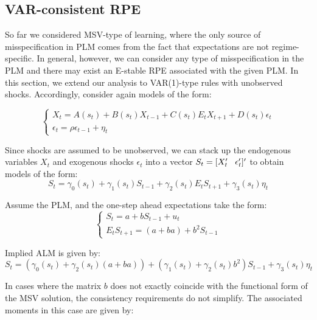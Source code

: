 \documentclass[12pt,reqno]{article}
\numberwithin{equation}{section}
\begin{document}





\subsection{VAR-consistent RPE} 

So far we considered MSV-type of learning, where the only source of misspecification in PLM comes from the fact that expectations are not regime-specific. In general, however, we can consider any type of misspecification in the PLM and there may exist an E-stable RPE associated with the given PLM. In this section, we extend our analysis to VAR(1)-type rules with unobserved shocks. 
Accordingly, consider again models of the form:

$$
\begin{cases}
X_t = A(s_t) + B(s_t) X_{t-1} + C(s_t) E_t X_{t+1} + D(s_t) \epsilon_t \\
\epsilon_t = \rho \epsilon_{t-1} + \eta_t 
\end{cases}
$$

Since shocks are assumed to be unobserved, we can stack up the endogenous variables $X_t $ and exogenous shocks $\epsilon_t $ into a vector $ S_t = [X_t' \hspace{3 mm}\epsilon_t']' $ to obtain models of the form: \\

$$
S_t = \gamma_0 (s_t) + \gamma_1 (s_t) S_{t-1} + \gamma_2(s_t) E_t S_{t+1}  + \gamma_3 (s_t) \eta_t
$$

Assume the PLM, and the one-step ahead expectations take the form: \\

$$
\begin{cases}
S_t = a + b S_{t-1} + u_t \\
E_t S_{t+1} = (a+ba)+ b^2 S_{t-1} 
\end{cases}
$$

Implied ALM is given by: \\

$$ 
S_t = (\gamma_0 (s_t) + \gamma_2 (s_t) (a+ba))+ (\gamma_1 (s_t) +\gamma_2 (s_t) b^2 )S_{t-1} + \gamma_3(s_t) \eta_t 
$$

In cases where the matrix $b $ does not exactly coincide with the functional form of the MSV solution, the consistency requirements do not simplify. The associated moments in this case are given by: \\
\end{document}

